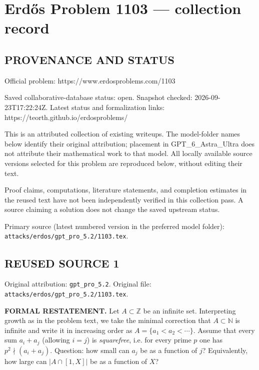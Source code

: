 \section*{Erd\H{o}s Problem 1103 --- collection record}

\subsection*{PROVENANCE AND STATUS}
Official problem: https://www.erdosproblems.com/1103

Saved collaborative-database status: open.
Snapshot checked: 2026-09-23T17:22:24Z.
Latest status and formalization links: https://teorth.github.io/erdosproblems/

This is an attributed collection of existing writeups. The model-folder names below identify their original attribution; placement in GPT\_6\_Astra\_Ultra does not attribute their mathematical work to that model. All locally available source versions selected for this problem are reproduced below, without editing their text.

Proof claims, computations, literature statements, and completion estimates in the reused text have not been independently verified in this collection pass. A source claiming a solution does not change the saved upstream status.

Primary source (latest numbered version in the preferred model folder): \texttt{attacks/erdos/gpt\_pro\_5.2/1103.tex}.

\subsection*{REUSED SOURCE 1}
Original attribution: \texttt{gpt\_pro\_5.2}.
Original file: \texttt{attacks/erdos/gpt\_pro\_5.2/1103.tex}.


\noindent\textbf{FORMAL RESTATEMENT.}
Let $A\subset\mathbb Z$ be an infinite set.
Interpreting growth as in the problem text, we take the minimal correction that $A\subset\mathbb N$ is infinite and write it in increasing order as $A=\{a_1<a_2<\cdots\}$.
Assume that every sum $a_i+a_j$ (allowing $i=j$) is \emph{squarefree}, i.e. for every prime $p$ one has $p^2\nmid (a_i+a_j)$.
Question: how small can $a_j$ be as a function of $j$? Equivalently, how large can $|A\cap[1,X]|$ be as a function of $X$?

